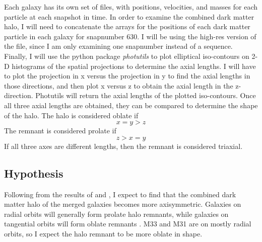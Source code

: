 \documentclass[linenumbers,trackchanges]{aastex7}
\begin{document}
Each galaxy has its own set of files, with positions, velocities, and masses for each particle at each snapshot in time. In order to examine the combined dark matter halo, I will need to concatenate the arrays for the positions of each dark matter particle in each galaxy for snapnumber 630. I will be using the high-res version of the file, since I am only examining one snapnumber instead of a sequence. Finally, I will use the python package \textit{photutils} to plot elliptical iso-contours on 2-D histograms of the spatial projections to determine the axial lengths. I will have to plot the projection in x versus the projection in y to find the axial lengths in those directions, and then plot x versus z to obtain the axial length in the z-direction. Photutils will return the axial lengths of the plotted iso-contours. Once all three axial lengths are obtained, they can be compared to determine the shape of the halo. The halo is considered oblate if \begin{equation}
     x = y > z
 \end{equation} The remnant is considered prolate if \begin{equation}
     z > x = y
 \end{equation} If all three axes are different lengths, then the remnant is considered triaxial.

\subsection{Hypothesis}
Following from the results of \cite{Drakos2019} and \cite{Abadi2010}, I expect to find that the combined dark matter halo of the merged galaxies becomes more axisymmetric. Galaxies on radial orbits will generally form prolate halo remnants, while galaxies on tangential orbits will form oblate remnants \citep{Drakos2019}. M33 and M31 are on mostly radial orbits, so I expect the halo remnant to be more oblate in shape. 

{}

\end{document}
